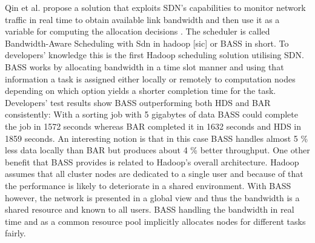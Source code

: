 \documentclass{acm_proc_article-sp}
\begin{document}
Qin et al. propose a solution that exploits SDN's capabilities to monitor network traffic in real time to obtain available link bandwidth and then use it as a variable for computing the allocation decisions \cite{Scheduling}. The scheduler is called Bandwidth-Aware Scheduling with Sdn in hadoop [sic] or BASS in short. To developers' knowledge this is the first Hadoop scheduling solution utilising SDN. BASS works by allocating bandwidth in a time slot manner and using that information a task is assigned either locally or remotely to computation nodes depending on which option yields a shorter completion time for the task. Developers' test results show BASS outperforming both HDS and BAR consistently: With a sorting job with 5 gigabytes of data BASS could complete the job in 1572 seconds whereas BAR completed it in 1632 seconds and HDS in 1859 seconds. An interesting notion is that in this case BASS handles almost 5 \% less data locally than BAR but produces about 4 \% better throughput. One other benefit that BASS provides is related to Hadoop's overall architecture. Hadoop assumes that all cluster nodes are dedicated to a single user and because of that the performance is likely to deteriorate in a shared environment. With BASS however, the network is presented in a global view and thus the bandwidth is a shared resource and known to all users. BASS handling the bandwidth in real time and as a common resource pool implicitly allocates nodes for different tasks fairly.
\end{document}
